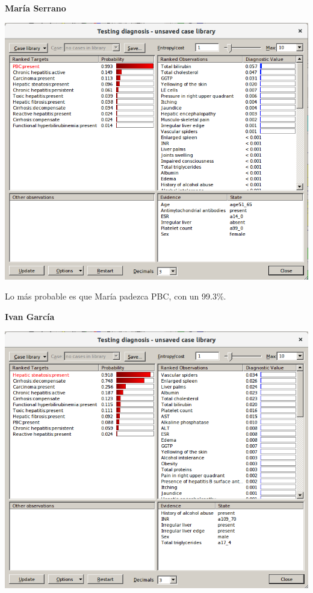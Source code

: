 \documentclass{article}
\begin{document}
\begin{enumerate}[label=\alph*)]
\textbf{María Serrano}
\begin{flushleft}
\includegraphics[scale=0.4]{Maria.png}
\end{flushleft}

Lo más probable es que María padezca PBC, con un 99.3\%.\\

\newpage

\textbf{Ivan García}
\begin{flushleft}
\includegraphics[scale=0.4]{ivan.png}
\end{flushleft}


\end{enumerate}
\end{document}
